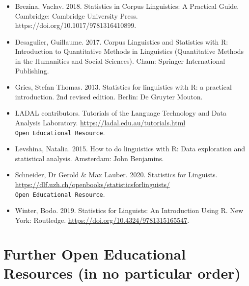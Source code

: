 \documentclass[
  letterpaper,
  DIV=11,
  numbers=noendperiod,
  oneside]{scrreprt}
\begin{document}
\begin{itemize}
\item
  Brezina, Vaclav. 2018. Statistics in Corpus Linguistics: A Practical
  Guide. Cambridge: Cambridge University Press.
  https://doi.org/10.1017/9781316410899.
\item
  Desagulier, Guillaume. 2017. Corpus Linguistics and Statistics with R:
  Introduction to Quantitative Methods in Linguistics (Quantitative
  Methods in the Humanities and Social Sciences). Cham: Springer
  International Publishing.
\item
  Gries, Stefan Thomas. 2013. Statistics for linguistics with R: a
  practical introduction. 2nd revised edition. Berlin: De Gruyter
  Mouton.
\item
  LADAL contributors. Tutorials of the Language Technology and Data
  Analysis Laboratory. \url{https://ladal.edu.au/tutorials.html}
  \texttt{Open\ Educational\ Resource}.
\item
  Levshina, Natalia. 2015. How to do linguistics with R: Data
  exploration and statistical analysis. Amsterdam: John Benjamins.
\item
  Schneider, Dr Gerold \& Max Lauber. 2020. Statistics for Linguists.
  \url{https://dlf.uzh.ch/openbooks/statisticsforlinguists/}
  \texttt{Open\ Educational\ Resource}.
\item
  Winter, Bodo. 2019. Statistics for Linguists: An Introduction Using R.
  New York: Routledge.
  \href{https://doi.org/10.1017/9781316410899}{https://doi.org/10.4324/9781315165547}.
\end{itemize}

\section{Further Open Educational Resources (in no particular
order)}\label{further-open-educational-resources-in-no-particular-order}
\end{document}
